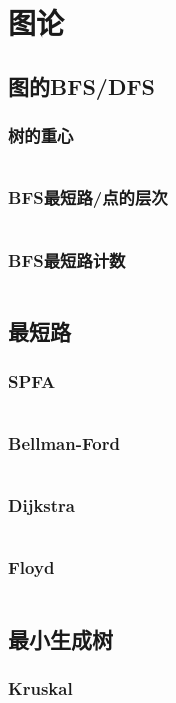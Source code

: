\documentclass[a4paper,12pt]{article}
\begin{document}
\newpage
\section{图论} %
\subsection{图的BFS/DFS}  %
\subsubsection{树的重心}
\inputminted[breaklines, linenos]{c++}{graph/bdfs/grav.cc}
\subsubsection{BFS最短路/点的层次}
\inputminted[breaklines, linenos]{c++}{graph/bdfs/cenci.cc}
\subsubsection{BFS最短路计数}
\inputminted[breaklines, linenos]{c++}{graph/bdfs/sum.cc}
\subsection{最短路} %
\subsubsection{SPFA}
\inputminted[breaklines, linenos]{c++}{graph/shortest_path/spfa.cc}
\subsubsection{Bellman-Ford}
\inputminted[breaklines, linenos]{c++}{graph/shortest_path/bellman.cc}
\subsubsection{Dijkstra}
\inputminted[breaklines, linenos]{c++}{graph/shortest_path/dij.cc}
\subsubsection{Floyd}
\inputminted[breaklines, linenos]{c++}{graph/shortest_path/floyd.cc}
\subsection{最小生成树} %
\subsubsection{Kruskal} 
\inputminted[breaklines, linenos]{c++}{graph/mst/kruskal.cc}
\end{document}
